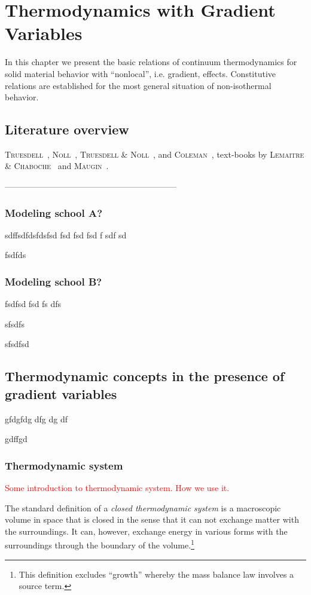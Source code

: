 
\chapter{Thermodynamics with Gradient Variables}

In this chapter we present the basic relations of continuum
thermodynamics for solid material behavior with ``nonlocal'', i.e. 
gradient, effects. Constitutive relations are established for the most 
general situation of non-isothermal behavior.

\section{Literature overview}

{\scshape Truesdell}~\cite{Truesdell1968}, {\scshape Noll}~\cite{Noll1958},
 {\scshape Truesdell \&
Noll}~\cite{Truesdell1965}, and {\scshape Coleman}~\cite{Coleman1964}, 
text-books by {\scshape Lemaitre \&
Chaboche}~\cite{Lemaitre1990a} and {\scshape Maugin}~\cite{Maugin1992}.

--------------------------------------------------------------

\subsection{Modeling school A?}
sdffsdfdsfdsfsd
fsd
fsd
fsd
f
sdf
sd

fsdfds

\subsection{Modeling school B?}
fsdfsd
fsd
fs
dfs

sfsdfs


sfsdfsd
\section{Thermodynamic concepts in the presence of gradient variables}
gfdgfdg
dfg
dg
df

gdffgd
\subsection{Thermodynamic system}

\textcolor{red}{Some introduction to thermodynamic system. How we use it.}
\begin{definition}

The standard definition of a {\em closed thermodynamic system} is a macroscopic
volume in space that is closed in the sense that it can not exchange matter with the
surroundings. It can, however, exchange energy in various forms with the 
surroundings through the boundary of the volume.\footnote{This 
definition excludes ``growth'' whereby the mass balance law involves a source term.}
\end{definition}

